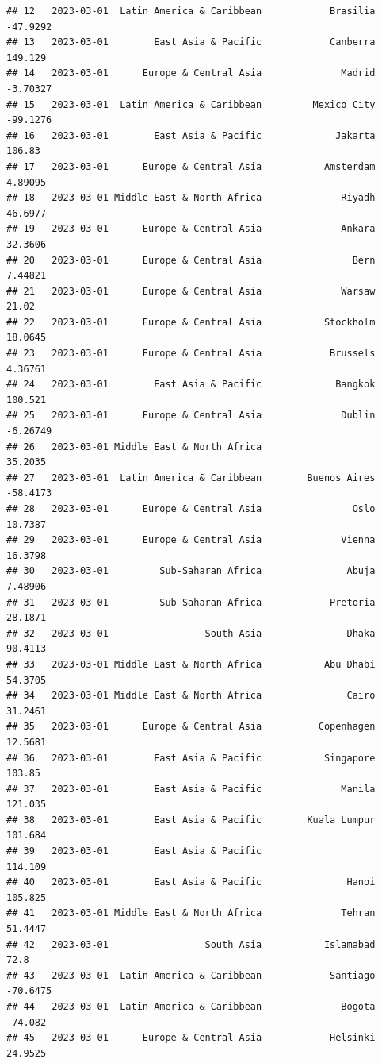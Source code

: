 \documentclass[
]{article}
\begin{document}
\begin{verbatim}
## 12   2023-03-01  Latin America & Caribbean            Brasilia   -47.9292
## 13   2023-03-01        East Asia & Pacific            Canberra    149.129
## 14   2023-03-01      Europe & Central Asia              Madrid   -3.70327
## 15   2023-03-01  Latin America & Caribbean         Mexico City   -99.1276
## 16   2023-03-01        East Asia & Pacific             Jakarta     106.83
## 17   2023-03-01      Europe & Central Asia           Amsterdam    4.89095
## 18   2023-03-01 Middle East & North Africa              Riyadh    46.6977
## 19   2023-03-01      Europe & Central Asia              Ankara    32.3606
## 20   2023-03-01      Europe & Central Asia                Bern    7.44821
## 21   2023-03-01      Europe & Central Asia              Warsaw      21.02
## 22   2023-03-01      Europe & Central Asia           Stockholm    18.0645
## 23   2023-03-01      Europe & Central Asia            Brussels    4.36761
## 24   2023-03-01        East Asia & Pacific             Bangkok    100.521
## 25   2023-03-01      Europe & Central Asia              Dublin   -6.26749
## 26   2023-03-01 Middle East & North Africa                        35.2035
## 27   2023-03-01  Latin America & Caribbean        Buenos Aires   -58.4173
## 28   2023-03-01      Europe & Central Asia                Oslo    10.7387
## 29   2023-03-01      Europe & Central Asia              Vienna    16.3798
## 30   2023-03-01         Sub-Saharan Africa               Abuja    7.48906
## 31   2023-03-01         Sub-Saharan Africa            Pretoria    28.1871
## 32   2023-03-01                 South Asia               Dhaka    90.4113
## 33   2023-03-01 Middle East & North Africa           Abu Dhabi    54.3705
## 34   2023-03-01 Middle East & North Africa               Cairo    31.2461
## 35   2023-03-01      Europe & Central Asia          Copenhagen    12.5681
## 36   2023-03-01        East Asia & Pacific           Singapore     103.85
## 37   2023-03-01        East Asia & Pacific              Manila    121.035
## 38   2023-03-01        East Asia & Pacific        Kuala Lumpur    101.684
## 39   2023-03-01        East Asia & Pacific                        114.109
## 40   2023-03-01        East Asia & Pacific               Hanoi    105.825
## 41   2023-03-01 Middle East & North Africa              Tehran    51.4447
## 42   2023-03-01                 South Asia           Islamabad       72.8
## 43   2023-03-01  Latin America & Caribbean            Santiago   -70.6475
## 44   2023-03-01  Latin America & Caribbean              Bogota    -74.082
## 45   2023-03-01      Europe & Central Asia            Helsinki    24.9525

\end{verbatim}
\end{document}
